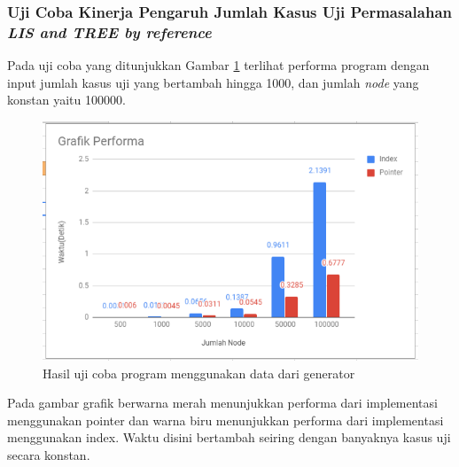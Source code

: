 		\subsubsection{\quad Uji Coba Kinerja Pengaruh Jumlah Kasus Uji Permasalahan \textit{LIS and TREE by reference}}
		\quad Pada uji coba yang ditunjukkan Gambar \ref{figure:graftestcase} terlihat performa program dengan input jumlah kasus uji yang bertambah hingga 1000, dan jumlah \textit{node} yang konstan yaitu 100000.
		\begin{figure}[H]
			\centerline{ \includegraphics[scale=0.65]{assets/images/GrafikPerformaNode.PNG}}
			\caption{Hasil uji coba program menggunakan data dari generator}
			\label{figure:graftestcase}
		\end{figure}
		\quad Pada gambar grafik berwarna merah menunjukkan performa dari implementasi menggunakan pointer dan warna biru menunjukkan performa dari implementasi menggunakan index. Waktu disini bertambah seiring dengan banyaknya kasus uji secara konstan.